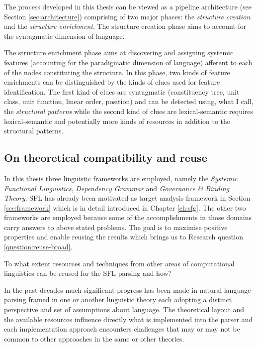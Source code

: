 The process developed in this thesis can be viewed as a pipeline architecture (see Section \ref{sec:architecture}) comprising of two major phases: the \textit{structure creation} and the \textit{structure enrichment}. The structure creation phase aims to account for the syntagmatic dimension of language. 

The structure enrichment phase aims at discovering and assigning systemic features (accounting for the paradigmatic dimension of language) afferent to each of the nodes constituting the structure. In this phase, two kinds of feature enrichments can be distinguished by the kinds of clues used for feature identification. The first kind of clues are syntagmatic (constituency tree, unit class, unit function, linear order, position) and can be detected using, what I call, the \textit{structural patterns} while the second kind of clues are lexical-semantic requires lexical-semantic and potentially more kinds of resources in addition to the structural patterns.

\subsection{On theoretical compatibility and reuse}
\label{sec:reuse}

In this thesis three linguistic frameworks are employed, namely the \textit{Systemic Functional Linguistics}, \textit{Dependency Grammar} and \textit{Governance \& Binding Theory}. SFL has already been motivated as target analysis framework in Section \ref{sec:framework} which is in detail introduced in Chapter \ref{ch:sfg}. The other two frameworks are employed because some of the accomplishments in those domains carry answers to above stated problems. The goal is to maximise positive properties and enable reusing the results which brings us to Research question \ref{question:reuse-broad}.

\begin{question}\label{question:reuse-broad}
    To what extent resources and techniques from other areas of computational linguistics can be reused for the SFL parsing and how?
\end{question}

In the past decades much significant progress has been made in natural language parsing framed in one or another linguistic theory each adopting a distinct perspective and set of assumptions about language. The theoretical layout and the available resources influence directly what is implemented into the parser and each implementation approach encounters challenges that may or may not be common to other approaches in the same or other theories. 

